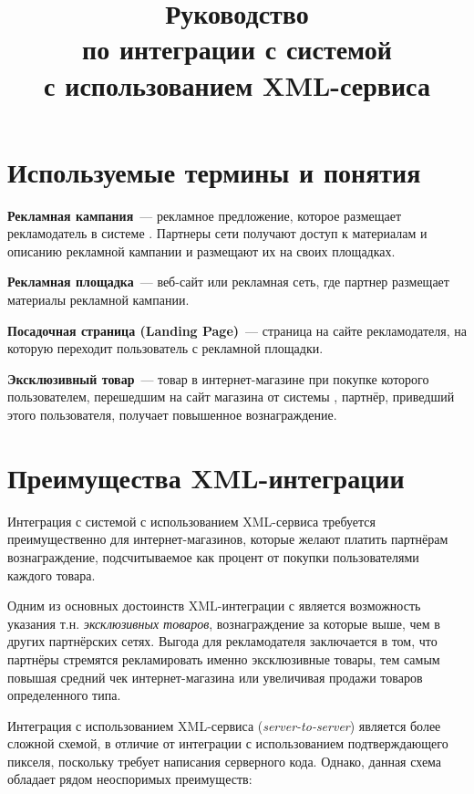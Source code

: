 \documentclass[a4paper,12pt]{article}
\title{Руководство \\ по интеграции с системой \heymoose \\ с использованием XML-сервиса}
\begin{document}
\maketitle

\thispagestyle{empty}

\newpage

\tableofcontents

\newpage

\section{Используемые термины и понятия}

\textbf{Рекламная кампания}~--- рекламное предложение, которое размещает рекламодатель в системе \heymoose. Партнеры сети \heymoose{} получают доступ к материалам и описанию рекламной кампании и размещают их на своих площадках.

\textbf{Рекламная площадка}~--- веб-сайт или рекламная сеть, где партнер размещает материалы рекламной кампании.

\textbf{Посадочная страница (Landing Page)}~--- страница на сайте рекламодателя, на которую переходит пользователь с рекламной площадки.

\textbf{Эксклюзивный товар}~--- товар в интернет-магазине при покупке которого пользователем, перешедшим на сайт магазина от системы \heymoose{}, партнёр, приведший этого пользователя, получает повышенное вознаграждение. 

\newpage

\section{Преимущества XML-интеграции}

Интеграция с системой \heymoose{} с использованием XML-сервиса требуется преимущественно для интернет-магазинов, которые желают платить партнёрам вознаграждение, подсчитываемое как процент от покупки пользователями каждого товара.

Одним из основных достоинств XML-интеграции с \heymoose{} является возможность указания т.н. \textit{эксклюзивных товаров}, вознаграждение за которые выше, чем в других партнёрских сетях. Выгода для рекламодателя заключается в том, что партнёры стремятся рекламировать именно эксклюзивные товары, тем самым повышая средний чек интернет-магазина или увеличивая продажи товаров определенного типа.

Интеграция с использованием XML-сервиса (\textit{server-to-server}) является более сложной схемой, в отличие от интеграции с использованием подтверждающего пикселя, поскольку требует написания серверного кода. Однако, данная схема обладает рядом неоспоримых преимуществ:
\end{document}
